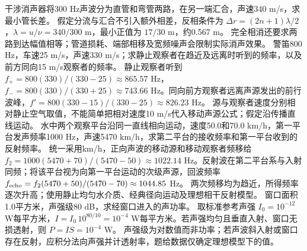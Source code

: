 \problemtext 干涉消声器将300 Hz声波分为直管和弯管两路，在另一端汇合，声速340 m/s，求最小管长差。
\workings 假定分流与汇合不引入额外相差，反相条件为 $\Delta r=(2n+1)\lambda/2$，$\lambda=u/\nu=340/300$ m，最小正值为 $17/30$ m，约0.567 m。
\crosscheck 完全相消还要求两路到达幅值相等；管道损耗、端部相移及宽频噪声会限制实际消声效果。
\problemtext 警笛800 Hz，车速25 m/s，声速330 m/s；求静止观察者在趋近及远离时听到的频率，以及前方同向15 m/s观察者的频率。
\workings 静止观察者听到 $f_+=800(330)/(330-25)\approx865.57$ Hz，$f_-=800(330)/(330+25)\approx743.66$ Hz。同向前方观察者远离声源发出的前行波峰，$f'=800(330-15)/(330-25)\approx826.23$ Hz。
\crosscheck 源与观察者速度分别相对静止空气取值，不能简单把相对速度10 m/s代入移动声源公式；假定沿传播直线运动。
\problemtext 水中两个观察平台沿同一直线相向运动，速度50.0和70.0 km/h，第一平台发声频率1000 Hz，声速5470 km/h，求第二平台的接收频率和第一平台收到的反射频率。
\workings 统一采用km/h，正向声波的移动源和移动观察者频移给 $f_2=1000(5470+70)/(5470-50)\approx1022.14$ Hz。反射波在第二平台系与入射同频；将该平台视为向第一平台运动的次级声源，回波频率 $f_{\rm echo}=f_2(5470+50)/(5470-70)\approx1044.85$ Hz。
\crosscheck 两次频移均为趋近，所得频率逐次升高；使用静止均匀水介质、经典径向运动及理想相干反射模型。
\problemtext 窗口面积1.0平方米，声强级80 dB，求经窗口进入的声功率。
\workings 取标准参考声强 $I_0=10^{-12}$ W每平方米，$I=I_0\,10^{80/10}=10^{-4}$ W每平方米。若声强均匀且垂直入射、窗口无损透射，则 $P=IS=10^{-4}$ W。
\crosscheck 声强级为对数值而非功率；若声波斜入射或窗口存在反射，应积分法向声强并计透射率，题给数据仅确定理想模型下的值。
